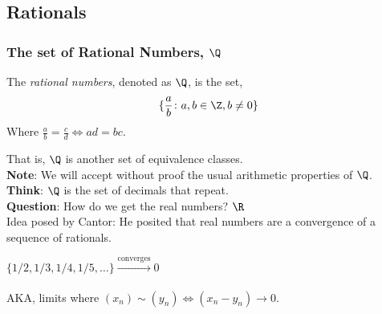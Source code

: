     \subsection{Rationals}

        \subsubsection{The set of Rational Numbers, $\Q$}

            \begin{definition}
                The \textit{rational numbers}, denoted as $\Q$, is the set, $$\{\frac{a}{b} \colon a,b \in \Z, b \ne 0\}$$
                Where $\frac{a}{b} = \frac{c}{d} \iff ad = bc$.
            \end{definition}
            \noindent That is, $\Q$ is another set of equivalence classes. \\
            \textbf{Note}: We will accept without proof the usual arithmetic properties of $\Q$. \\

            \textbf{Think}: $\Q$ is the set of decimals that repeat. \\

            \textbf{Question}: How do we get the real numbers? $\R$ \\

            Idea posed by Cantor: He posited that real numbers are a convergence of a sequence of rationals. 

            \begin{example}
                $\{1/2,1/3,1/4,1/5,\dots\} \xrightarrow[\text{}]{\text{converges}} 0$
            \end{example}

            AKA, limits where $(x_n) \sim (y_n) \iff (x_n - y_n) \rightarrow 0$.